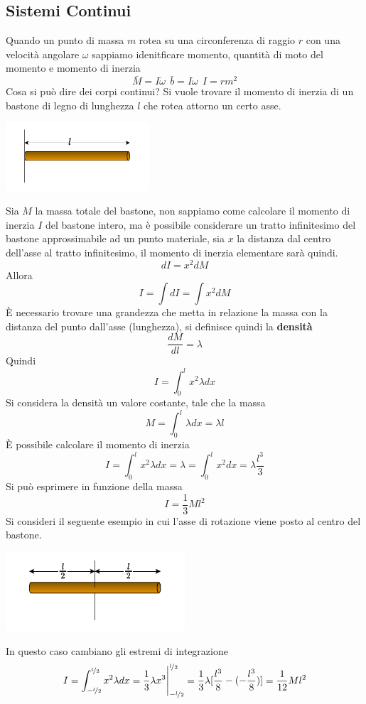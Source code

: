 \documentclass[10pt, letterpaper]{report}
\begin{document}
\subsection{Sistemi Continui}
Quando un punto di massa $m$ rotea su una  circonferenza di raggio $r$ con una velocità angolare $\omega$ 
sappiamo idenitficare momento, quantità di moto del momento e momento di inerzia 
$$ \bar M = I\dot{\omega} \ \ \bar b = I\omega \ \ I=rm^2$$
Cosa si può dire dei corpi continui? Si vuole trovare il momento di inerzia di un bastone di legno di lunghezza $l$ che rotea attorno un certo asse.
\begin{center}
    \includegraphics[width=0.4\textwidth ]{images/bastone.pdf}
\end{center}
Sia $M$ la massa totale del bastone, non sappiamo come calcolare il momento di inerzia $I$ del bastone intero, ma è possibile considerare un tratto infinitesimo del bastone approssimabile ad un punto materiale, sia $x$ la 
distanza dal centro dell'asse al tratto infinitesimo, il momento di inerzia elementare sarà quindi.
$$ dI=x^2dM$$
Allora 
$$ I=\int dI=\int x^2dM$$
È necessario trovare una grandezza che metta in relazione la massa con la distanza del punto dall'asse (lunghezza), si definisce quindi la \textbf{densità}
$$ \frac{dM}{dl}=\lambda$$
Quindi 
$$I=\int_0^lx^2\lambda dx $$
Si considera la densità un valore costante, tale che la massa 
$$ M=\int_0^l\lambda dx = \lambda l$$
È possibile calcolare il momento di inerzia 
$$I=\int_0^lx^2\lambda dx =\lambda=\int_0^lx^2 dx =\lambda\frac{l^3}{3}$$
Si può esprimere in funzione della massa 
$$ I=\frac{1}{3}Ml^2$$
Si consideri il seguente esempio in cui l'asse di rotazione viene posto al centro del bastone.\begin{center}
    \includegraphics[width=0.5\textwidth ]{images/bastone2.pdf}
\end{center}
In questo caso cambiano gli estremi di integrazione 
$$ I=\int_{-\nicefrac{l}{2}}^{\nicefrac{l}{2}}x^2\lambda dx=\frac{1}{3}\lambda x^3\Bigg|_{-\nicefrac{l}{2}}^{\nicefrac{l}{2}}=\frac{1}{3}\lambda [\frac{l^3}{8}-(-\frac{l^3}{8})]= 
\frac{1}{12}Ml^2$$
\end{document}
